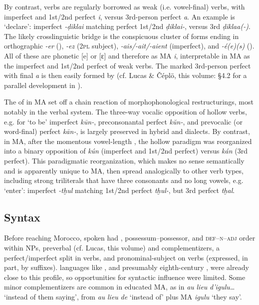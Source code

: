 \documentclass[output=paper]{langsci/langscibook}
\begin{document}
By contrast,  verbs are regularly borrowed as weak (i.e. vowel-final) verbs, with imperfect and 1st/2nd perfect \textit{i}, versus 3rd-person perfect \textit{a}. An example is ‘declare’: imperfect \textit{\nobreakdash-ḍikla{\R}i} matching perfect 1st/2nd \textit{ḍikla{\R}i-}, versus 3rd \textit{ḍikla{\R}a(-)}. The likely crosslinguistic bridge is the conspicuous cluster of  forms ending in orthographic \textit{{}-er} (), \textit{{}-ez} (2\textsc{pl} subject), \textit{{}-ais/-ait/-aient} (imperfect), and \textit{-é(e)(s)} (). All of these are phonetic [e] or [ɛ] and therefore  as MA \textit{i}, interpretable in MA as the imperfect and 1st/2nd perfect of weak verbs. The marked 3rd-person perfect with final \textit{a} is then easily formed by   (cf. Lucas \& Čéplö, this volume: §4.2 for a parallel development in ).

The  of  in  MA set off a chain reaction of morphophonological restructurings, most notably in the verbal system. The  three-way vocalic opposition of hollow verbs, e.g. for ‘to be’ imperfect \textit{kūn-}, preconsonantal perfect \textit{kŭn-}, and prevocalic (or word-final) perfect \textit{kān-}, is largely preserved in hybrid and  dialects. By contrast, in  MA, after the momentous vowel-length , the hollow paradigm was reorganized into a binary opposition of \textit{kún} (imperfect and 1st/2nd perfect) versus \textit{kán} (3rd perfect). This paradigmatic reorganization, which makes no sense semantically and is apparently unique to  MA, then spread analogically to other verb types, including strong triliterals that have three consonants and no long vowels, e.g. ‘enter’: imperfect \textit{-tḫul} matching 1st/2nd perfect \textit{tḫul-}, but 3rd perfect \textit{tḫal}.

\subsection{Syntax}

Before reaching Morocco, spoken  had , possessum--possessor, and \textsc{def--n--adj} order within NPs, preverbal  (cf. Lucas, this volume) and complementizers, a perfect/imperfect split in verbs, and pronominal-subject  on verbs (expressed, in part, by suffixes).  languages like , and presumably eighth-century , were already close to this profile, so opportunities for syntactic influence were limited. Some minor  complementizers are common in educated MA, as in \textit{au} \textit{lieu} \textit{d’igulu…} ‘instead of them saying’, from  \textit{au} \textit{lieu} \textit{de} ‘instead of’ plus MA \textit{igulu} ‘they say’. 
\end{document}
